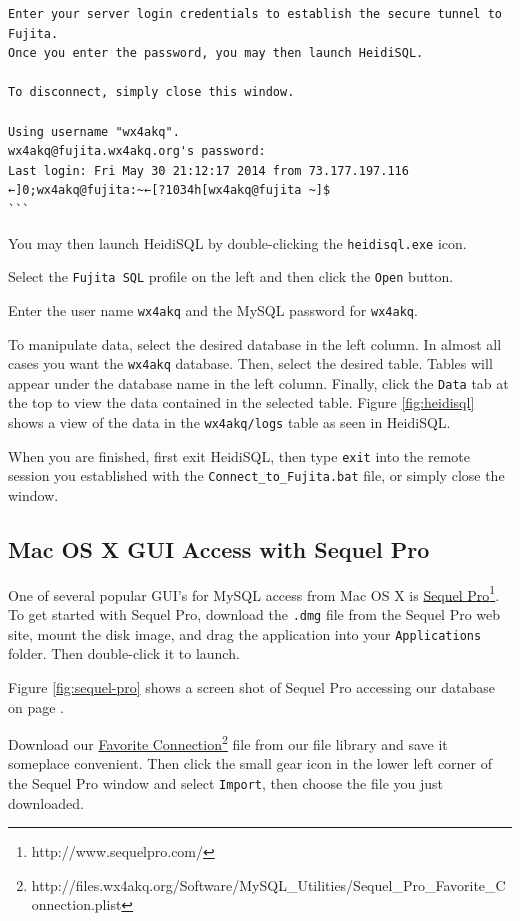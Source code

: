 \documentclass[pdflatex,letterpaper,twoside,12pt]{book}
\begin{document}
\begin{verbatim}
Enter your server login credentials to establish the secure tunnel to Fujita.
Once you enter the password, you may then launch HeidiSQL.

To disconnect, simply close this window.

Using username "wx4akq".
wx4akq@fujita.wx4akq.org's password:
Last login: Fri May 30 21:12:17 2014 from 73.177.197.116
←]0;wx4akq@fujita:~←[?1034h[wx4akq@fujita ~]$
```
\end{verbatim}

You may then launch HeidiSQL by double-clicking the \texttt{heidisql.exe} icon.

Select the \texttt{Fujita SQL} profile on the left and then click the \texttt{Open} button.

Enter the user name \texttt{wx4akq} and the MySQL password for \texttt{wx4akq}.

To manipulate data, select the desired database in the left column.  In almost all cases you want the \texttt{wx4akq} database.  Then, select the desired table.  Tables will appear under the database name in the left column.  Finally, click the \texttt{Data} tab at the top to view the data contained in the selected table.  Figure \ref{fig:heidisql} shows a view of the data in the \texttt{wx4akq/logs} table as seen in HeidiSQL.

When you are finished, first exit HeidiSQL, then type \texttt{exit} into the remote session you established with the \texttt{Connect\_to\_Fujita.bat} file, or simply close the window.

\subsection{Mac OS X GUI Access with Sequel Pro}

One of several popular GUI's for MySQL access from Mac OS X is \href{http://www.sequelpro.com/}{Sequel Pro}\footnote{http://www.sequelpro.com/}.  To get started with Sequel Pro, download the \texttt{.dmg} file from the Sequel Pro web site, mount the disk image, and drag the application into your \texttt{Applications} folder.  Then double-click it to launch.

Figure \ref{fig:sequel-pro} shows a screen shot of Sequel Pro accessing our database on page \pageref{fig:sequel-pro}.

Download our \href{http://files.wx4akq.org/Software/MySQL\_Utilities/Sequel\_Pro\_Favorite\_Connection.plist}{Favorite Connection}\footnote{http://files.wx4akq.org/Software/MySQL\_Utilities/Sequel\_Pro\_Favorite\_Connection.plist} file from our file library and save it someplace convenient.  Then click the small gear icon in the lower left corner of the Sequel Pro window and select \texttt{Import}, then choose the file you just downloaded.
\end{document}
